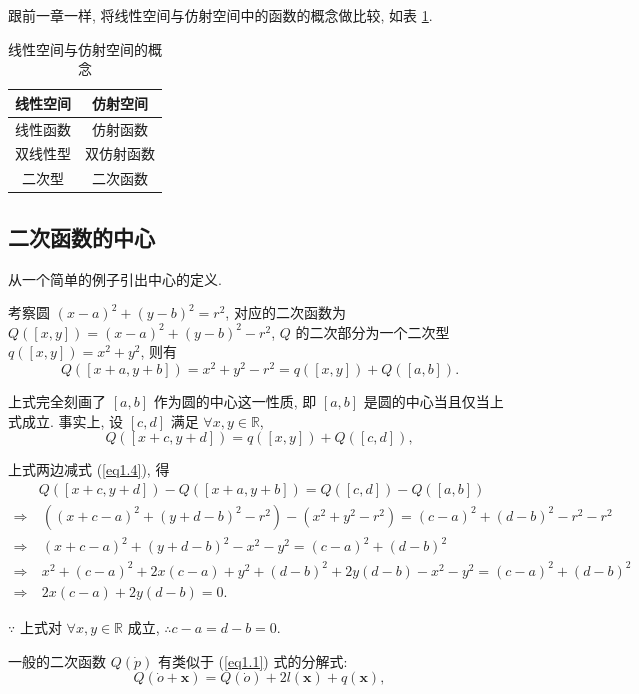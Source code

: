 \documentclass{ctexart}
\begin{document}
跟前一章一样, 将线性空间与仿射空间中的函数的概念做比较, 如表 \ref{tb1}.
\begin{table}\caption{线性空间与仿射空间的概念}\label{tb1}
    \begin{center}
        \begin{tabular}{c|c}
            线性空间 & 仿射空间 \\
            \hline
            线性函数 & 仿射函数 \\
            双线性型 & 双仿射函数 \\
            二次型 & 二次函数 \\
        \end{tabular}
    \end{center}
\end{table}
\subsection{二次函数的中心}
从一个简单的例子引出中心的定义.
\begin{example}
    考察圆 $(x-a)^2+(y-b)^2=r^2$, 对应的二次函数为 $Q([x,y])=(x-a)^2+(y-b)^2-r^2$, $Q$ 的二次部分为一个二次型 $q([x,y])=x^2+y^2$, 则有
    \begin{equation}\label{eq1.4}
        Q([x+a,y+b])=x^2+y^2-r^2=q([x,y])+Q([a,b]).
    \end{equation}
    
    上式完全刻画了 $[a,b]$ 作为圆的中心这一性质, 即 $[a,b]$ 是圆的中心当且仅当上式成立. 事实上, 设 $[c,d]$ 满足 $\forall x,y\in\mathbb{R}$,
    \[Q([x+c,y+d])=q([x,y])+Q([c,d]),\]

    上式两边减式 (\ref{eq1.4}), 得
    \begin{align*}
        & Q([x+c,y+d])-Q([x+a,y+b])=Q([c,d])-Q([a,b]) \\
        \Rightarrow &\ ((x+c-a)^2+(y+d-b)^2-r^2)-(x^2+y^2-r^2)=(c-a)^2+(d-b)^2-r^2-r^2 \\
        \Rightarrow &\ (x+c-a)^2+(y+d-b)^2-x^2-y^2=(c-a)^2+(d-b)^2 \\
        \Rightarrow &\ x^2+(c-a)^2+2x(c-a)+y^2+(d-b)^2+2y(d-b)-x^2-y^2=(c-a)^2+(d-b)^2 \\
        \Rightarrow &\ 2x(c-a)+2y(d-b)=0.
    \end{align*}

    $\because$ 上式对 $\forall x,y\in\mathbb{R}$ 成立, $\therefore c-a=d-b=0$.
\end{example}
一般的二次函数 $Q(\dot{p})$ 有类似于 (\ref{eq1.1}) 式的分解式:
\[Q(\dot{o}+\boldsymbol{x})=Q(\dot{o})+2l(\boldsymbol{x})+q(\boldsymbol{x}),\]
\end{document}
